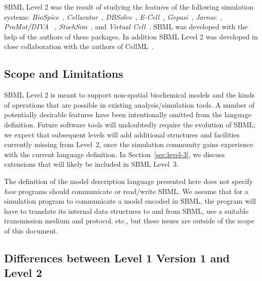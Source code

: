 \documentclass[10pt]{cekarticle}
\begin{document}
SBML Level 2 was the result of studying the features of the
following simulation systems: \emph{BioSpice}~\citep{arkin:2001},
\emph{Cellarator}~\citep{shapiro:2000}, \emph{DBSolve}~\citep{goryanin:2001,goryanin:1999},
\emph{E-Cell}~\citep{tomita:1999,tomita:2001},
\emph{Gepasi}~\citep{mendes:1997,mendes:2001},
\emph{Jarnac}~\citep{sauro:2000,sauro:1991}, \emph{ProMot/DIVA}
~\citep{trankle:1997},
 \emph{StochSim}~\citep{bray:2001,morton-firth:1998},
and \emph{Virtual Cell}~\citep{schaff:2000,schaff:2001}. SBML was
developed with the help of the authors of these packages.  In addition SBML Level 2 was developed in close collaboration with the authors of CellML~\citep{Physiome:2001}.


\subsection{Scope and Limitations}

SBML Level 2 is meant to support non-spatial biochemical models
and the kinds of operations that are possible in existing
analysis/simulation tools.  A number of potentially desirable
features have been intentionally omitted from the language
definition.  Future software tools will undoubtedly require the
evolution of SBML; we expect that subsequent levels will add
additional structures and facilities currently missing from
Level~2, once the simulation community gains experience with the
current language definition. In Section~\ref{sec:level-3}, we
discuss extensions that will likely be included in SBML Level~3.

The definition of the model description language presented here does not
specify \emph{how} programs should communicate or read/write SBML.  We
assume that for a simulation program to communicate a model encoded in
SBML, the program will have to translate its internal data structures to
and from SBML, use a suitable transmission medium and protocol, etc., but
these issues are outside of the scope of this document.

\subsection{Differences between Level 1 Version 1 and Level 2}
\end{document}
